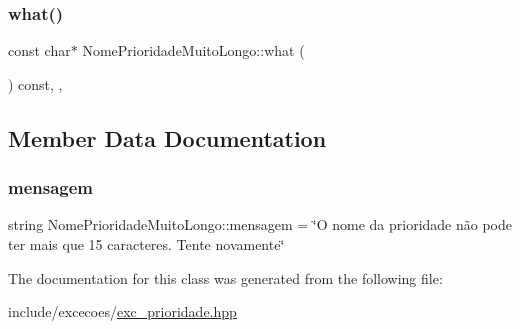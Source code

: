 \subsubsection{\texorpdfstring{what()}{what()}}
{\footnotesize\ttfamily const char$\ast$ Nome\+Prioridade\+Muito\+Longo\+::what (\begin{DoxyParamCaption}{ }\end{DoxyParamCaption}) const\hspace{0.3cm}{\ttfamily [inline]}, {\ttfamily [override]}, {\ttfamily [noexcept]}}



\subsection{Member Data Documentation}
\mbox{\label{classNomePrioridadeMuitoLongo_aa80f887bae3a735020c0113998991345}} 
\subsubsection{\texorpdfstring{mensagem}{mensagem}}
{\footnotesize\ttfamily string Nome\+Prioridade\+Muito\+Longo\+::mensagem = \char`\"{}O nome da prioridade não pode ter mais que 15 caracteres. Tente novamente\char`\"{}\hspace{0.3cm}{\ttfamily [private]}}



The documentation for this class was generated from the following file\+:\begin{DoxyCompactItemize}
\item 
include/excecoes/\hyperlink{exc__prioridade_8hpp}{exc\+\_\+prioridade.\+hpp}\end{DoxyCompactItemize}
